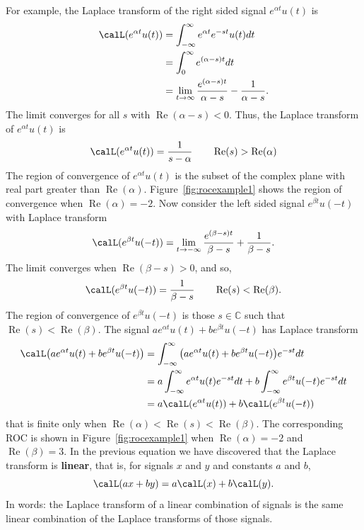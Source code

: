 \documentclass[11pt,a4paper]{book}
\theoremstyle{plain}
\numberwithin{equation}{section}
\newcommand{\complex}{{\mathbb C}}
\renewcommand{\Re}{\operatorname{Re}}
\newcommand{\term}{\textbf}
\begin{document}
For example, the Laplace transform of the right sided signal $e^{ \alpha t}u(t)$ is
\begin{align*}
\calL(e^{ \alpha t}u(t)) &= \int_{-\infty}^{\infty} e^{ \alpha t} e^{-st} u(t) dt \\
&= \int_{0}^{\infty} e^{(\alpha - s)t} dt \\
&= \lim_{t\rightarrow\infty}\frac{e^{(\alpha-s)t}}{\alpha - s} - \frac{1}{\alpha-s}.
\end{align*}
The limit converges for all $s$ with $\Re(\alpha - s) <0$.  Thus, the Laplace transform of $e^{\alpha t}u(t)$ is
\[
\calL(e^{ \alpha t}u(t)) = \frac{1}{s-\alpha} \qquad \Re(s) > \Re(\alpha)
\]
The region of convergence of $e^{\alpha t}u(t)$ is the subset of the complex plane with real part greater than $\Re(\alpha)$.  Figure~\ref{fig:rocexample1} shows the region of convergence when $\Re(\alpha) = -2$.  Now consider the left sided signal $e^{\beta t}u(-t)$ with Laplace transform
\[
\calL(e^{\beta t}u(-t)) = \lim_{t\rightarrow -\infty}\frac{e^{(\beta-s)t}}{\beta - s} + \frac{1}{\beta-s}.
\]
The limit converges when $\Re(\beta - s) > 0$, and so,
\[
\calL(e^{\beta t}u(-t)) = \frac{1}{\beta-s} \qquad \Re(s) < \Re(\beta).
\]
The region of convergence of $e^{\beta t}u(-t)$ is those $s \in \complex$ such that $\Re(s) < \Re(\beta)$.  The signal $a e^{ \alpha t}u(t) + b e^{\beta t}u(-t)$ has Laplace transform
\begin{align*}
\calL\big( a e^{ \alpha t}u(t) + b e^{\beta t}u(-t) \big) &= \int_{-\infty}^{\infty} \big( a e^{ \alpha t}u(t) + b e^{\beta t}u(-t) \big) e^{-st} dt \\
&= a \int_{-\infty}^{\infty} e^{ \alpha t}u(t) e^{-st} dt + b\int_{-\infty}^{\infty} e^{\beta t}u(-t)  e^{-st} dt \\
&= a \calL(e^{ \alpha t}u(t)) + b\calL(e^{\beta t}u(-t))
\end{align*}
that is finite only when $\Re(\alpha) < \Re(s) < \Re(\beta)$.  The corresponding ROC is shown in Figure~\ref{fig:rocexample1} when $\Re(\alpha) = -2$ and $\Re(\beta)=3$.   In the previous equation we have discovered that the Laplace transform is \term{linear}, that is, for signals $x$ and $y$ and constants $a$ and $b$,
\begin{equation}\label{eq:laplacetransislinear}
\calL(ax + by) = a\calL(x) + b\calL(y).
\end{equation}
In words: the Laplace transform of a linear combination of signals is the same linear combination of the Laplace transforms of those signals.
\end{document}
